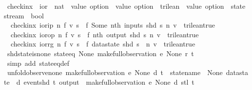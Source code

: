\begin{isabellebody}
\isanewline
{}\isamarkupfalse%
\ check{\isacharunderscore}inx\ {\isacharcolon}{\isacharcolon}\ {\isachardoublequoteopen}ior\ {\isasymRightarrow}\ nat\ {\isasymRightarrow}\ {\isacharparenleft}value\ option\ {\isasymRightarrow}\ value\ option\ {\isasymRightarrow}\ trilean{\isacharparenright}\ {\isasymRightarrow}\ value\ option\ {\isasymRightarrow}\ state\ stream\ {\isasymRightarrow}\ bool{\isachardoublequoteclose}\ \isanewline
\ \ {\isachardoublequoteopen}check{\isacharunderscore}inx\ ior{\isachardot}ip\ n\ f\ v\ s\ {\isacharequal}\ {\isacharparenleft}f\ {\isacharparenleft}Some\ {\isacharparenleft}nth\ {\isacharparenleft}inputs\ {\isacharparenleft}shd\ s{\isacharparenright}{\isacharparenright}\ {\isacharparenleft}n{\isacharminus}{}{\isacharparenright}{\isacharparenright}{\isacharparenright}\ v\ {\isacharequal}\ trilean{\isachardot}true{\isacharparenright}{\isachardoublequoteclose}\ {\isacharbar}\isanewline
\ \ {\isachardoublequoteopen}check{\isacharunderscore}inx\ ior{\isachardot}op\ n\ f\ v\ s\ {\isacharequal}\ {\isacharparenleft}f\ {\isacharparenleft}nth\ {\isacharparenleft}output\ {\isacharparenleft}shd\ s{\isacharparenright}{\isacharparenright}\ n{\isacharparenright}\ v\ {\isacharequal}\ trilean{\isachardot}true{\isacharparenright}{\isachardoublequoteclose}\ {\isacharbar}\isanewline
\ \ {\isachardoublequoteopen}check{\isacharunderscore}inx\ ior{\isachardot}rg\ n\ f\ v\ s\ {\isacharequal}\ {\isacharparenleft}f\ {\isacharparenleft}datastate\ {\isacharparenleft}shd\ s{\isacharparenright}\ {\isachardollar}\ n{\isacharparenright}\ v\ {\isacharequal}\ trilean{\isachardot}true{\isacharparenright}{\isachardoublequoteclose}\isanewline
\isanewline
{}\isamarkupfalse%
\ shd{\isacharunderscore}state{\isacharunderscore}is{\isacharunderscore}none{\isacharcolon}\ {\isachardoublequoteopen}{\isacharparenleft}state{\isacharunderscore}eq\ None{\isacharparenright}\ {\isacharparenleft}make{\isacharunderscore}full{\isacharunderscore}observation\ e\ None\ r\ t{\isacharparenright}{\isachardoublequoteclose}\isanewline
%
\isadelimproof
\ \ %
\endisadelimproof
%
\isatagproof
{}\isamarkupfalse%
\ {\isacharparenleft}simp\ add{\isacharcolon}\ state{\isacharunderscore}eq{\isacharunderscore}def{\isacharparenright}%
\endisatagproof
{\isafoldproof}%
%
\isadelimproof
\isanewline
%
\endisadelimproof
\isanewline
{}\isamarkupfalse%
\ unfold{\isacharunderscore}observe{\isacharunderscore}none{\isacharcolon}\ {\isachardoublequoteopen}make{\isacharunderscore}full{\isacharunderscore}observation\ e\ None\ d\ t\ {\isacharequal}\ {\isacharparenleft}{\isasymlparr}statename\ {\isacharequal}\ None{\isacharcomma}\ datastate\ {\isacharequal}\ d{\isacharcomma}\ event{\isacharequal}{\isacharparenleft}shd\ t{\isacharparenright}{\isacharcomma}\ output\ {\isacharequal}\ {\isacharbrackleft}{\isacharbrackright}{\isasymrparr}{\isacharhash}{\isacharhash}{\isacharparenleft}make{\isacharunderscore}full{\isacharunderscore}observation\ e\ None\ d\ {\isacharparenleft}stl\ t{\isacharparenright}{\isacharparenright}{\isacharparenright}{\isachardoublequoteclose}\isanewline

\end{isabellebody}
